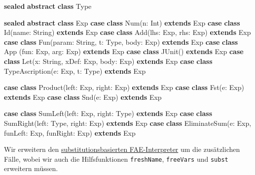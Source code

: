 \documentclass[]{article}
\newenvironment{Shaded}{}{}
\newcommand{\FunctionTok}[1]{\textcolor[rgb]{0.02,0.16,0.49}{#1}}
\newcommand{\KeywordTok}[1]{\textcolor[rgb]{0.00,0.44,0.13}{\textbf{#1}}}
\newcommand{\NormalTok}[1]{#1}
\begin{document}
\begin{Shaded}
\begin{Highlighting}[]
\KeywordTok{sealed} \KeywordTok{abstract} \KeywordTok{class}\NormalTok{ Type}

\KeywordTok{sealed} \KeywordTok{abstract} \KeywordTok{class}\NormalTok{ Exp}
\KeywordTok{case} \KeywordTok{class} \FunctionTok{Num}\NormalTok{(n: Int) }\KeywordTok{extends}\NormalTok{ Exp}
\KeywordTok{case} \KeywordTok{class} \FunctionTok{Id}\NormalTok{(name: String) }\KeywordTok{extends}\NormalTok{ Exp}
\KeywordTok{case} \KeywordTok{class} \FunctionTok{Add}\NormalTok{(lhs: Exp, rhs: Exp) }\KeywordTok{extends}\NormalTok{ Exp}
\KeywordTok{case} \KeywordTok{class} \FunctionTok{Fun}\NormalTok{(param: String, t: Type, body: Exp) }\KeywordTok{extends}\NormalTok{ Exp}
\KeywordTok{case} \KeywordTok{class} \FunctionTok{App}\NormalTok{ (fun: Exp, arg: Exp) }\KeywordTok{extends}\NormalTok{ Exp}
\KeywordTok{case} \KeywordTok{class} \FunctionTok{JUnit}\NormalTok{() }\KeywordTok{extends}\NormalTok{ Exp}
\KeywordTok{case} \KeywordTok{class} \FunctionTok{Let}\NormalTok{(x: String, xDef: Exp, body: Exp) }\KeywordTok{extends}\NormalTok{ Exp}
\KeywordTok{case} \KeywordTok{class} \FunctionTok{TypeAscription}\NormalTok{(e: Exp, t: Type) }\KeywordTok{extends}\NormalTok{ Exp}

\KeywordTok{case} \KeywordTok{class} \FunctionTok{Product}\NormalTok{(left: Exp, right: Exp) }\KeywordTok{extends}\NormalTok{ Exp}
\KeywordTok{case} \KeywordTok{class} \FunctionTok{Fst}\NormalTok{(e: Exp) }\KeywordTok{extends}\NormalTok{ Exp}
\KeywordTok{case} \KeywordTok{class} \FunctionTok{Snd}\NormalTok{(e: Exp) }\KeywordTok{extends}\NormalTok{ Exp}

\KeywordTok{case} \KeywordTok{class} \FunctionTok{SumLeft}\NormalTok{(left: Exp, right: Type) }\KeywordTok{extends}\NormalTok{ Exp}
\KeywordTok{case} \KeywordTok{class} \FunctionTok{SumRight}\NormalTok{(left: Type, right: Exp) }\KeywordTok{extends}\NormalTok{ Exp}
\KeywordTok{case} \KeywordTok{class} \FunctionTok{EliminateSum}\NormalTok{(e: Exp, funLeft: Exp, funRight: Exp) }\KeywordTok{extends}\NormalTok{ Exp}
\end{Highlighting}
\end{Shaded}

Wir erweitern den
\protect\hyperlink{substitutionsbasierter-interpreter-a}{substitutionsbasierten
FAE-Interpreter} um die zusätzlichen Fälle, wobei wir auch die
Hilfsfunktionen \texttt{freshName}, \texttt{freeVars} und \texttt{subst}
erweitern müssen.
\end{document}
